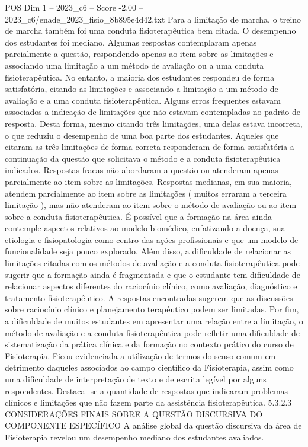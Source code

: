 \begin{textsample}{POS Dim 1 – 2023\_c6 – Score -2.00 – 2023\_c6/enade\_2023\_fisio\_8b895e4d42.txt}
Para a limitação de marcha, o treino de marcha também foi uma conduta fisioterapêutica bem citada.
O desempenho dos estudantes foi mediano.
Algumas respostas contemplaram apenas parcialmente a questão, respondendo apenas ao item sobre as limitações e associando uma limitação a um método de avaliação ou a uma conduta fisioterapêutica.
No entanto, a maioria dos estudantes respondeu de forma satisfatória, citando as limitações e associando a limitação a um método de avaliação e a uma conduta fisioterapêutica.
Alguns erros frequentes estavam associados a indicação de limitações que não estavam contempladas no padrão de resposta.
Desta forma, mesmo citando três limitações, uma delas estava incorreta, o que reduziu o desempenho de uma boa parte dos estudantes.
Aqueles que citaram as três limitações de forma correta responderam de forma satisfatória a continuação da questão que solicitava o método e a conduta fisioterapêutica indicados.
Respostas fracas não abordaram a questão ou atenderam apenas parcialmente ao item sobre as limitações.
Respostas medianas, em sua maioria, atendem parcialmente ao item sobre as limitações ( muitos erraram a terceira limitação ), mas não atenderam ao item sobre o método de avaliação ou ao item sobre a conduta fisioterapêutica.
É possível que a formação na área ainda contemple aspectos relativos ao modelo biomédico, enfatizando a doença, sua etiologia e fisiopatologia como centro das ações profissionais e que um modelo de funcionalidade seja pouco explorado.
Além disso, a dificuldade de relacionar as limitações citadas com os métodos de avaliação e a conduta fisioterapêutica pode sugerir que a formação ainda é fragmentada e que o estudante tem dificuldade de relacionar aspectos diferentes do raciocínio clínico, como avaliação, diagnóstico e tratamento fisioterapêutico.
A respostas encontradas sugerem que as discussões sobre raciocínio clínico e planejamento terapêutico podem ser limitadas.
Por fim, a dificuldade de muitos estudantes em apresentar uma relação entre a limitação, o método de avaliação e a conduta fisioterapêutica pode refletir uma dificuldade de sistematização da prática clínica e da formação no contexto prático do curso de Fisioterapia.
Ficou evidenciada a utilização de termos do senso comum em detrimento daqueles associados ao campo científico da Fisioterapia, assim como uma dificuldade de interpretação de texto e de escrita legível por alguns respondentes.
Destaca -se a quantidade de respostas que indicaram problemas clínicos e limitações que não fazem parte da assistência fisioterapêutica. 5.3.2.3 CONSIDERAÇÕES FINAIS SOBRE A QUESTÃO DISCURSIVA DO COMPONENTE ESPECÍFICO A análise global da questão discursiva da área de Fisioterapia revelou um desempenho mediano dos estudantes avaliados.

\end{textsample}
